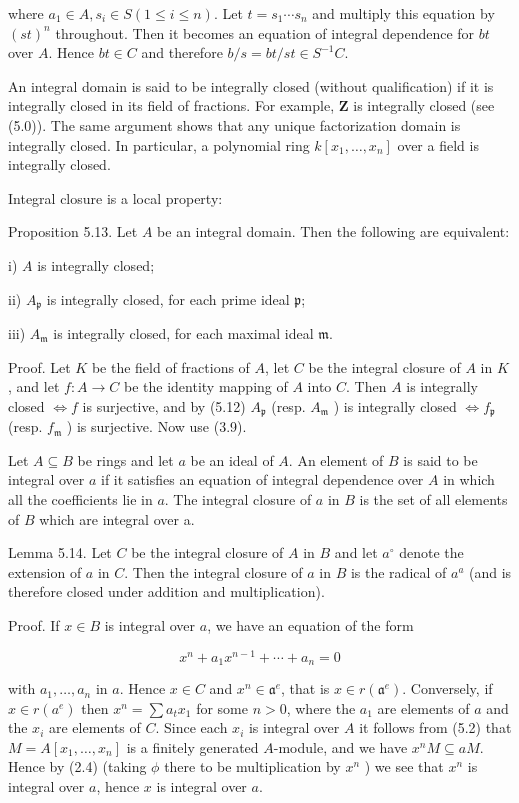 \documentclass{standalone}
\theoremstyle{definition}
\theoremstyle{remark}
\begin{document}
where $a_{1} \in A, s_{i} \in S(1 \leqslant i \leqslant n)$. Let $t=s_{1} \cdots s_{n}$ and multiply this equation by $(s t)^{n}$ throughout. Then it becomes an equation of integral dependence for $b t$ over $A$. Hence $b t \in C$ and therefore $b / s=b t / s t \in S^{-1} C$.

An integral domain is said to be integrally closed (without qualification) if it is integrally closed in its field of fractions. For example, $\mathbf{Z}$ is integrally closed (see (5.0)). The same argument shows that any unique factorization domain is integrally closed. In particular, a polynomial ring $k\left[x_{1}, \ldots, x_{n}\right]$ over a field is integrally closed.

Integral closure is a local property:

Proposition 5.13. Let $A$ be an integral domain. Then the following are equivalent:

i) $A$ is integrally closed;

ii) $A_{\mathfrak{p}}$ is integrally closed, for each prime ideal $\mathfrak{p}$;

iii) $A_{\mathfrak{m}}$ is integrally closed, for each maximal ideal $\mathfrak{m}$.

Proof. Let $K$ be the field of fractions of $A$, let $C$ be the integral closure of $A$ in $K$, and let $f: A \rightarrow C$ be the identity mapping of $A$ into $C$. Then $A$ is integrally closed $\Leftrightarrow f$ is surjective, and by (5.12) $A_{\mathfrak{p}}$ (resp. $A_{\mathfrak{m}}$ ) is integrally closed $\Leftrightarrow f_{\mathfrak{p}}$ (resp. $f_{\mathfrak{m}}$ ) is surjective. Now use (3.9).

Let $A \subseteq B$ be rings and let $a$ be an ideal of $A$. An element of $B$ is said to be integral over $a$ if it satisfies an equation of integral dependence over $A$ in which all the coefficients lie in $a$. The integral closure of $a$ in $B$ is the set of all elements of $B$ which are integral over a.

Lemma 5.14. Let $C$ be the integral closure of $A$ in $B$ and let $a^{\circ}$ denote the extension of $a$ in $C$. Then the integral closure of $a$ in $B$ is the radical of $a^{a}$ (and is therefore closed under addition and multiplication).

Proof. If $x \in B$ is integral over $a$, we have an equation of the form

\[
x^{n}+a_{1} x^{n-1}+\cdots+a_{n}=0
\]

with $a_{1}, \ldots, a_{n}$ in $a$. Hence $x \in C$ and $x^{n} \in \mathfrak{a}^{e}$, that is $x \in r\left(\mathfrak{a}^{e}\right)$. Conversely, if $x \in r\left(a^{e}\right)$ then $x^{n}=\sum a_{t} x_{1}$ for some $n>0$, where the $a_{1}$ are elements of $a$ and the $x_{i}$ are elements of $C$. Since each $x_{i}$ is integral over $A$ it follows from (5.2) that $M=A\left[x_{1}, \ldots, x_{n}\right]$ is a finitely generated $A$-module, and we have $x^{n} M \subseteq a M$. Hence by (2.4) (taking $\phi$ there to be multiplication by $x^{n}$ ) we see that $x^{n}$ is integral over $a$, hence $x$ is integral over $a$.
\end{document}
